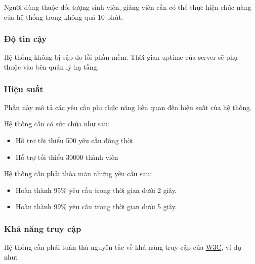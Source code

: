 \documentclass[./../main.tex]{subfiles}
\begin{document}
Người dùng thuộc đối tượng sinh viên, giảng viên cần có thể thực hiện
chức năng của hệ thống trong không quá 10 phút.

\hypertarget{ux111ux1ed9-tin-cux1eady}{%
	\subsubsection{Độ tin cậy}\label{ux111ux1ed9-tin-cux1eady}}

Hệ thống không bị sập do lỗi phần mềm. Thời gian uptime của server sẽ
phụ thuộc vào bên quản lý hạ tầng.

\hypertarget{hiux1ec7u-suux1ea5t}{%
	\subsubsection{Hiệu suất}\label{hiux1ec7u-suux1ea5t}}

Phần này mô tả các yêu cầu phi chức năng liên quan đến hiệu suất của hệ
thống.

Hệ thống cần có sức chứa như sau:

\begin{itemize}
	\item
	      
	      	Hỗ trợ tối thiểu 500 yêu cầu đồng thời
	      
	\item
	      
	      	Hỗ trợ tối thiểu 30000 thành viên
	      
\end{itemize}

Hệ thống cần phải thỏa mãn những yêu cầu sau:

\begin{itemize}
	\item
	      
	      	Hoàn thành 95\% yêu cầu trong thời gian dưới 2 giây.
	      
	\item
	      
	      	Hoàn thành 99\% yêu cầu trong thời gian dưới 5 giây.
	      
\end{itemize}

\hypertarget{khux1ea3-nux103ng-truy-cux1eadp}{%
	\subsubsection{Khả năng truy cập}\label{khux1ea3-nux103ng-truy-cux1eadp}}

Hệ thống cần phải tuân thủ nguyên tắc về khả năng truy cập của
\href{https://www.w3.org/WAI/fundamentals/accessibility-principles/}{\underline{W3C}},
ví dụ như:
\end{document}
